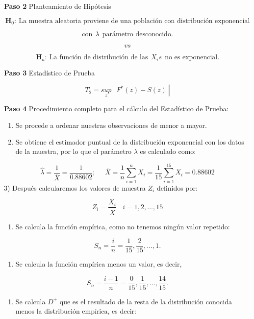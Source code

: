 \documentclass[
  a4paper,
  oneside,
  openany]{book}
\providecommand{\tightlist}{%
  \setlength{\itemsep}{0pt}\setlength{\parskip}{0pt}}
\begin{document}
\textbf{Paso 2} Planteamiento de Hipótesis

\[\textbf{H}_0: \ \mbox{La muestra aleatoria proviene de una población con distribución exponencial}\]

\[\mbox{con} \ \  \lambda \ \  \mbox{parámetro desconocido.}\]

\[vs\]

\[\textbf{H}_a: \ \mbox{La función de distribución de las} \ \  X_{i}s \ \  \mbox{no es exponencial.}\]

\textbf{Paso 3} Estadístico de Prueba

\[T_{2}=\underset{z}{sup} \ | \ F^*(z)-S(z) \ |\]

\textbf{Paso 4} Procedimiento completo para el cálculo del Estadístico de Prueba:

\begin{enumerate}
\def\labelenumi{\arabic{enumi})}
\item
  Se procede a ordenar nuestras observaciones de menor a mayor.
\item
  Se obtiene el estimador puntual de la distribución exponencial con los datos de la muestra, por lo que el parámetro \(\lambda\) es calculado como:
\end{enumerate}

\[\hat{\lambda}=\frac{1}{\overline{X}}=\frac{1}{0.88602}; \ \ \ \ \ \  \overline{X}=\frac{1}{n}\sum_{i=1}^{n}X_{i}=\frac{1}{15}\sum_{i=1}^{15}X_{i}=0.88602\]
3) Después calcularemos los valores de muestra \(Z_{i}\) definidos por:

\[Z_{i}=\frac{X_{i}}{\overline{X}} \ \ \ \ i=1,2,\ldots,15\]

\begin{enumerate}
\def\labelenumi{\arabic{enumi})}
\setcounter{enumi}{3}
\tightlist
\item
  Se calcula la función empírica, como no tenemos ningún valor repetido:
\end{enumerate}

\[S_{n}= \frac{i}{n}=\frac{1}{15},\frac{2}{15}, \ldots, 1. \]

\begin{enumerate}
\def\labelenumi{\arabic{enumi})}
\setcounter{enumi}{4}
\tightlist
\item
  Se calcula la función empírica menos un valor, es decir,
\end{enumerate}

\[S_{n}= \frac{i-1}{n}=\frac{0}{15},\frac{1}{15}, \ldots, \frac{14}{15}.\]

\begin{enumerate}
\def\labelenumi{\arabic{enumi})}
\setcounter{enumi}{5}
\tightlist
\item
  Se calcula \(D^+\) que es el resultado de la resta de la distribución conocida menos la distribución empírica, es decir:
\end{enumerate}
\end{document}
